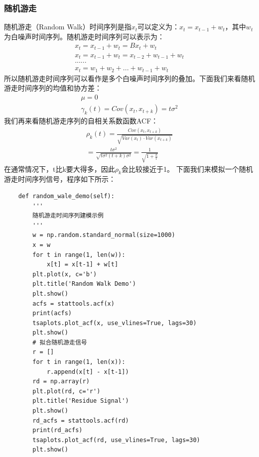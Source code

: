 \documentclass{article}
\begin{document}
\subsubsection{随机游走}
随机游走（Random Walk）时间序列是指$x_{t}$可以定义为：$x_{t}=x_{t-1}+w_{t}$，其中$w_{t}$为白噪声时间序列。随机游走时间序列可以表示为：
\begin{equation}
\begin{aligned}
x_{t}=x_{t-1}+w_{t}=Bx_{t}+w_{t} \\
x_{t}=x_{t-1}+w_{t}=x_{t-2}+w_{t-1}+w_{t} \\
...... \\
x_{t}=w_{1} + w_{2} + ... + w_{t-1} + w_{t}
\end{aligned}
\label{e000021}
\end{equation}
所以随机游走时间序列可以看作是多个白噪声时间序列的叠加。下面我们来看随机游走时间序列的均值和协方差：
\begin{equation}
\begin{aligned}
\mu = 0 \\
\gamma _{k}(t)=Cov(x_{t}, x_{t+k})=t \sigma ^{2}
\end{aligned}
\label{e000022}
\end{equation}
我们再来看随机游走序列的自相关系数函数ACF：
\begin{equation}
\begin{aligned}
\rho _{k}(t)=\frac{Cov(x_{t}, x_{t+k})}{\sqrt{ Var(x_{t}) \cdot Var(x_{t+k}) }} \\
=\frac{t \sigma ^{2}}{\sqrt{t \sigma ^{2} (t+k) \sigma ^{2}}}=\frac{1}{\sqrt{1+ \frac{k}{t} }}
\end{aligned}
\label{e000023}
\end{equation}
在通常情况下，t比k要大得多，因此$\rho_{k}$会比较接近于1。\newline
下面我们来模拟一个随机游走时间序列信号，程序如下所示：
\begin{lstlisting}
    def random_wale_demo(self):
        '''
        随机游走时间序列建模示例
        '''
        w = np.random.standard_normal(size=1000)
        x = w
        for t in range(1, len(w)):
            x[t] = x[t-1] + w[t]
        plt.plot(x, c='b')
        plt.title('Random Walk Demo')
        plt.show()
        acfs = stattools.acf(x)
        print(acfs)
        tsaplots.plot_acf(x, use_vlines=True, lags=30)
        plt.show()
        # 拟合随机游走信号
        r = []
        for t in range(1, len(x)):
            r.append(x[t] - x[t-1])
        rd = np.array(r)
        plt.plot(rd, c='r')
        plt.title('Residue Signal')
        plt.show()
        rd_acfs = stattools.acf(rd)
        print(rd_acfs)
        tsaplots.plot_acf(rd, use_vlines=True, lags=30)
        plt.show()
\end{lstlisting}
\end{document}
